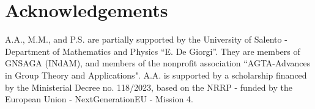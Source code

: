 \documentclass[11pt]{amsart}
\theoremstyle{definition}
\begin{document}
\bigskip





\bigskip 

\section*{Acknowledgements}

\smallskip

A.A., M.M., and P.S. are partially supported by the University of Salento - Department of Mathematics and Physics ``E. De Giorgi”. They are members of GNSAGA (INdAM), and members of the nonprofit association ``AGTA-Advances in Group Theory and Applications". A.A. is supported by a scholarship
financed by the Ministerial Decree no. 118/2023, based on the NRRP - funded by the
European Union - NextGenerationEU - Mission 4. 



\bigskip\bigskip



\makeatletter
\renewrobustcmd*{\mkbibemph}{}
\protected\long{}
\makeatother



\printbibliography

\bigskip \bigskip
\end{document}
